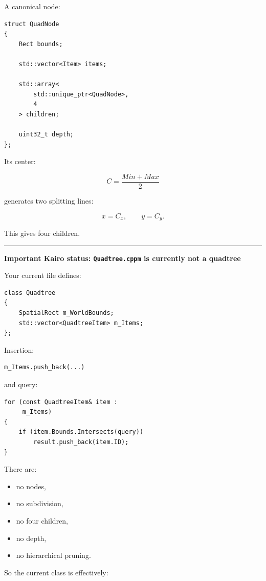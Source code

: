 A canonical node:

\begin{verbatim}
struct QuadNode
{
    Rect bounds;

    std::vector<Item> items;

    std::array<
        std::unique_ptr<QuadNode>,
        4
    > children;

    uint32_t depth;
};
\end{verbatim}

Its center:

\[
C=
\frac{Min+Max}{2}
\]

generates two splitting lines:

\[
x=C_x,
\qquad
y=C_y.
\]

This gives four children.

\begin{center}\rule{0.5\linewidth}{0.5pt}\end{center}

\textbf{Important Kairo status: \texttt{Quadtree.cppm} is currently not a quadtree}

Your current file defines:

\begin{verbatim}
class Quadtree
{
    SpatialRect m_WorldBounds;
    std::vector<QuadtreeItem> m_Items;
};
\end{verbatim}

Insertion:

\begin{verbatim}
m_Items.push_back(...)
\end{verbatim}

and query:

\begin{verbatim}
for (const QuadtreeItem& item :
     m_Items)
{
    if (item.Bounds.Intersects(query))
        result.push_back(item.ID);
}
\end{verbatim}

There are:

\begin{itemize}
\tightlist
\item
  no nodes,
\item
  no subdivision,
\item
  no four children,
\item
  no depth,
\item
  no hierarchical pruning.
\end{itemize}

So the current class is effectively:

